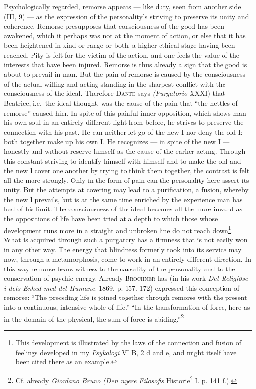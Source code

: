 \documentclass[12pt,a4paper,openany]{book}
\newcommand{\opage}[1]{\marginnote{\footnotesize\textit{[#1]}}}
\begin{document}
Psychologically regarded, remorse appears --- like duty, seen from another
\opage{120}side (III, 9) --- as the expression of the personality's striving to preserve its unity and
coherence. Remorse presupposes that consciousness of the good has been awakened, which it perhaps was not
at the moment of action, or else that it has been heightened in kind or range or both, a higher ethical
stage having been reached. Pity is felt for the victim of the action, and one feels the value of the
interests that have been injured. Remorse is thus already a sign that the good is about to prevail in man.
But the pain of remorse is caused by the consciousness of the actual willing and acting standing in the
sharpest conflict with the consciousness of the ideal. Therefore \textsc{Dante} says
\textit{(Purgatorio} XXXI) that Beatrice, i.e.\ the ideal thought, was the cause of the pain that ``the
nettles of remorse'' caused him. In spite of this painful inner opposition, which shows man his own soul
in an entirely different light from before, he strives to preserve the connection with his past. He can
neither let go of the new I nor deny the old I: both together make up his own I. He recognizes --- in
spite of the new I --- honestly and without reserve himself as the cause of the earlier acting. Through
this constant striving to identify himself with himself and to make the old and the new I cover one
another by trying to think them together, the contrast is felt all the more strongly. Only in the form of
pain can the personality here assert its unity. But the attempts at covering may lead to a purification,
a fusion, whereby the new I prevails, but is at the same time enriched by the experience man has had of
his limit. The consciousness of the ideal becomes all the more inward as the oppositions of life have been
tried at a depth to which those whose development runs more in a straight and unbroken line do not reach
down\footnote[1]{This development is illustrated by the laws of the connection and fusion of feelings
developed in my \textit{Psykologi} VI B, 2 d and e, and might itself have been cited there as an
example.}. What is acquired through such a purgatory has a firmness that is not easily won in any other
way. The energy that blindness formerly took into its service may now, through a metamorphosis, come to
work in an entirely different
\opage{121}direction. In this way remorse bears witness to the causality of the personality and to the
conservation of psychic energy. Already \textsc{Bröchner} has (in his work \textit{Det Religiøse i dets
Enhed med det Humane.} 1869. p. 157. 172) expressed this conception of remorse: ``The preceding life is
joined together through remorse with the present into a continuous, intensive whole of life.'' ``In the
transformation of force, here as in the domain of the physical, the sum of force is abiding.''\footnote[1]{Cf.
already \emph{Giordano Bruno} \textit{(Den nyere Filosofis} Historie\textsuperscript{2} I. p. 141 f.).}
\end{document}
